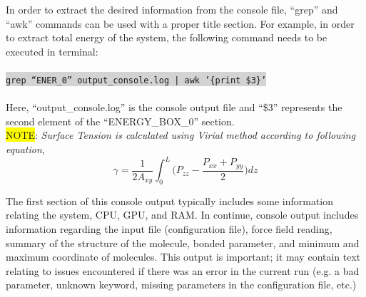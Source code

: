 \newline
\newline
In order to extract the desired information from the console file, ``grep'' and ``awk'' commands can be used with a proper title section. For example, in order to extract total energy of the system, the following command needs to be executed in terminal:\\\\
\colorbox{lightgray}{
\texttt{grep ``ENER\_0''   output\_console.log | awk '\{{print \$3}\}'}
}\\\\
Here, ``output\_console.log'' is the console output file and ``\$3'' represents the second element of the ``ENERGY\_BOX\_0'' section.\\

\colorbox{yellow}{NOTE}: \textit{Surface Tension is calculated using Virial method according to following equation,}
\begin{equation}
	\gamma = \frac{1}{2A_{xy}} \int_{0}^{L} \bigg(P_{zz} - \frac{P_{xx} + P_{yy}}{2} \bigg) dz
\end{equation}

The first section of this console output typically includes some information relating the system, CPU, GPU, and RAM. In continue, console output includes information regarding the input file (configuration file), force field reading, summary of the structure of the molecule, bonded parameter, and minimum and maximum coordinate of molecules. This output is important; it may contain text relating to issues encountered if there was an error in the current run (e.g. a bad parameter, unknown keyword, missing parameters in the configuration file, etc.)\\\\

